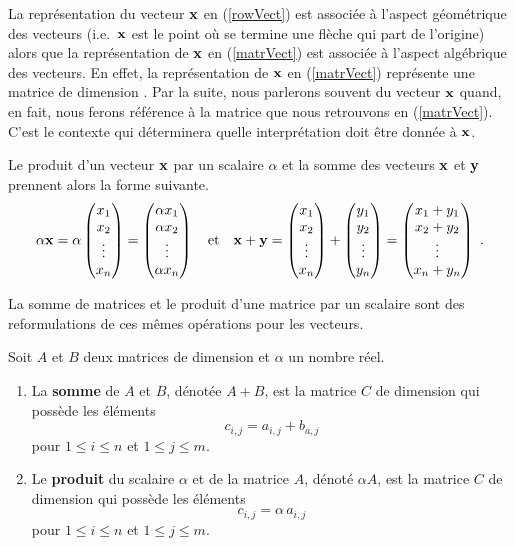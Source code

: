 {La représentation du vecteur $\mathbf{x}$ en (\ref{rowVect}) est associée
à l'aspect géométrique des vecteurs (i.e.\ $\mathbf{x}$ est le point où
se termine une flèche qui part de l'origine) alors que la représentation de
$\mathbf{x}$ en (\ref{matrVect}) est associée à l'aspect algébrique des
vecteurs.  En effet, la représentation de $\mathbf{x}$ en
(\ref{matrVect}) représente une matrice de dimension .  Par
la suite, nous parlerons souvent du vecteur $\mathbf{x}$ quand, en fait, nous
ferons référence à la matrice que nous retrouvons en (\ref{matrVect}).
C'est le contexte qui déterminera quelle interprétation doit être
donnée à $\mathbf{x}$.

Le produit d'un vecteur $\mathbf{x}$ par un scalaire $\alpha$ et la somme
des vecteurs $\mathbf{x}$ et $\mathbf{y}$ prennent alors la forme suivante.
\[
\alpha \mathbf{x} = \alpha
\begin{pmatrix} x_1 \\ x_2 \\ \vdots \\ x_n \end{pmatrix}
= \begin{pmatrix}\alpha x_1 \\ \alpha x_2 \\ \vdots \\ \alpha x_n
\end{pmatrix}
\quad \text{et}
\quad
\mathbf{x}+\mathbf{y} =
\begin{pmatrix} x_1 \\ x_2 \\ \vdots \\ x_n \end{pmatrix}
+ \begin{pmatrix} y_1 \\ y_2 \\ \vdots \\ y_n \end{pmatrix}
= \begin{pmatrix} x_1+y_1 \\ x_2+y_2 \\ \vdots \\ x_n+y_n \end{pmatrix}
\ .
\]

La somme de matrices et le produit d'une matrice par un scalaire sont
des reformulations de ces mêmes opérations pour les vecteurs.

\begin{focus}{\dfn}
Soit $A$ et $B$ deux matrices de dimension  et $\alpha$
un nombre réel.
\begin{enumerate}
\item La {\bfseries somme} 
de $A$ et $B$, dénotée $A+B$, est la
matrice $C$ de dimension  qui possède les éléments
\[
c_{i,j} = a_{i,j} + b_{a,j}
\]
pour $1\leq i \leq n$ et $1\leq j \leq  m$.
\item Le {\bfseries produit}
du scalaire $\alpha$ et de la matrice
$A$, dénoté $\alpha A$, est la matrice $C$ de dimension 
qui possède les éléments
\[
c_{i,j} = \alpha \, a_{i,j}
\]
pour $1\leq i \leq n$ et $1\leq j \leq  m$.
\end{enumerate}
\end{focus}

}
